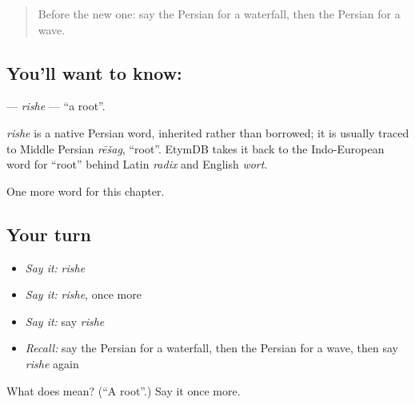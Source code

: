\label{lesson:FA-C103-rishe}



\begin{quote}
Before the new one: say the Persian for a waterfall, then the Persian for a wave.
\end{quote}

\subsection*{You'll want to know: }
\textbf{} — \emph{rishe} — \textquotedblleft{}a root\textquotedblright{}.

\begin{cousinweb}
\emph{rishe} is a native Persian word, inherited rather than borrowed; it is usually traced to Middle Persian \emph{rēšag}, \textquotedblleft{}root\textquotedblright{}. EtymDB takes it back to the Indo-European word for \textquotedblleft{}root\textquotedblright{} behind Latin \emph{radix} and English \emph{wort}.
\end{cousinweb}

\begin{grammarlens}[title={What you've built}]
One more word for this chapter.
\end{grammarlens}

\subsection*{Your turn}
\begin{itemize}
\raggedright
  \item \emph{Say it:} \emph{rishe}
  \item \emph{Say it:} \emph{rishe}, once more
  \item \emph{Say it:} say \emph{rishe}
  \item \emph{Recall:} say the Persian for a waterfall, then the Persian for a wave, then say \emph{rishe} again
\end{itemize}

\begin{tcolorbox}[breakable,colback=teal!4,colframe=teal!35!black,title={Before you move on}]
What does  mean? (\textquotedblleft{}A root\textquotedblright{}.) Say it once more.
\end{tcolorbox}
